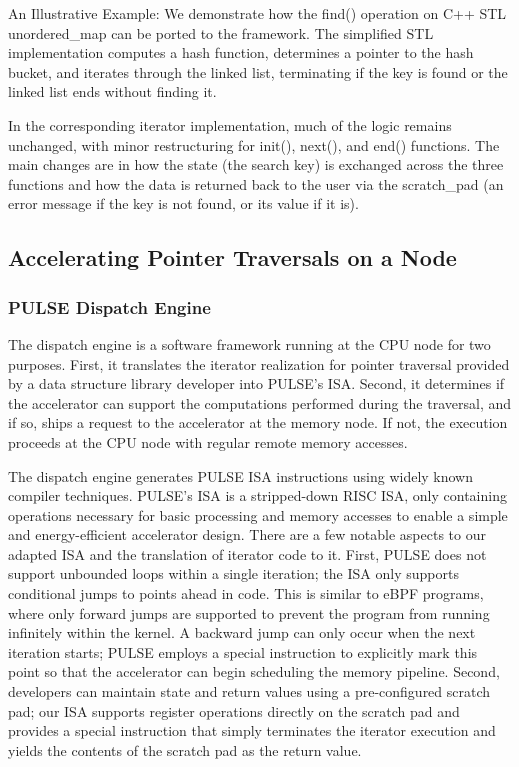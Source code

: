 An Illustrative Example: We demonstrate how the find() operation on C++ STL unordered\_map can be ported to the framework. The simplified STL implementation computes a hash function, determines a pointer to the hash bucket, and iterates through the linked list, terminating if the key is found or the linked list ends without finding it.

In the corresponding iterator implementation, much of the logic remains unchanged, with minor restructuring for init(), next(), and end() functions. The main changes are in how the state (the search key) is exchanged across the three functions and how the data is returned back to the user via the scratch\_pad (an error message if the key is not found, or its value if it is).

\subsection{Accelerating Pointer Traversals on a Node}


\subsubsection{PULSE Dispatch Engine}

The dispatch engine is a software framework running at the CPU node for two purposes. First, it translates the iterator realization for pointer traversal provided by a data structure library developer into PULSE's ISA. Second, it determines if the accelerator can support the computations performed during the traversal, and if so, ships a request to the accelerator at the memory node. If not, the execution proceeds at the CPU node with regular remote memory accesses.

The dispatch engine generates PULSE ISA instructions using widely known compiler techniques. PULSE's ISA is a stripped-down RISC ISA, only containing operations necessary for basic processing and memory accesses to enable a simple and energy-efficient accelerator design. There are a few notable aspects to our adapted ISA and the translation of iterator code to it. First, PULSE does not support unbounded loops within a single iteration; the ISA only supports conditional jumps to points ahead in code. This is similar to eBPF programs, where only forward jumps are supported to prevent the program from running infinitely within the kernel. A backward jump can only occur when the next iteration starts; PULSE employs a special instruction to explicitly mark this point so that the accelerator can begin scheduling the memory pipeline. Second, developers can maintain state and return values using a pre-configured scratch pad; our ISA supports register operations directly on the scratch pad and provides a special instruction that simply terminates the iterator execution and yields the contents of the scratch pad as the return value.

